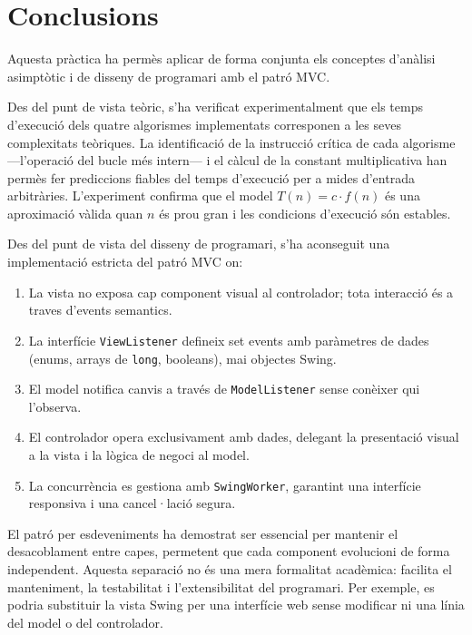 \documentclass[conference,compsoc]{IEEEtran}
\begin{document}
\section{Conclusions}

Aquesta pràctica ha permès aplicar de forma conjunta els conceptes
d'anàlisi asimptòtic i de disseny de programari amb el patró MVC.

Des del punt de vista teòric, s'ha verificat experimentalment que els
temps d'execució dels quatre algorismes implementats corresponen a les
seves complexitats teòriques. La identificació de la instrucció crítica
de cada algorisme ---l'operació del bucle més intern--- i el càlcul de la
constant multiplicativa han permès fer prediccions fiables del temps
d'execució per a mides d'entrada arbitràries. L'experiment confirma que
el model $T(n) = c \cdot f(n)$ és una aproximació vàlida quan $n$ és prou
gran i les condicions d'execució són estables.

Des del punt de vista del disseny de programari, s'ha aconseguit una
implementació estricta del patró MVC on:

\begin{enumerate}
    \item La vista no exposa cap component visual al controlador;
          tota interacció és a traves d'events semantics.
    \item La interfície \texttt{ViewListener} defineix set events amb
          paràmetres de dades (enums, arrays de \texttt{long}, booleans),
          mai objectes Swing.
    \item El model notifica canvis a través de \texttt{ModelListener}
          sense conèixer qui l'observa.
    \item El controlador opera exclusivament amb dades, delegant la
          presentació visual a la vista i la lògica de negoci al model.
    \item La concurrència es gestiona amb \texttt{SwingWorker}, garantint
          una interfície responsiva i una cancel·lació segura.
\end{enumerate}

El patró per esdeveniments ha demostrat ser essencial per mantenir el
desacoblament entre capes, permetent que cada component evolucioni de
forma independent. Aquesta separació no és una mera formalitat acadèmica:
facilita el manteniment, la testabilitat i l'extensibilitat del
programari. Per exemple, es podria substituir la vista Swing per una
interfície web sense modificar ni una línia del model o del
controlador.
\end{document}
